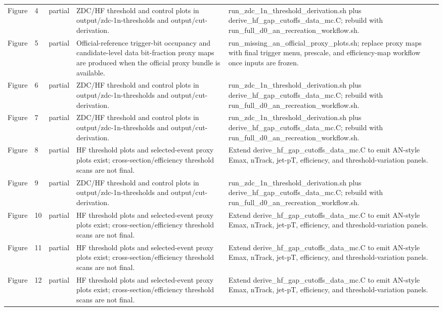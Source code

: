\documentclass[11pt]{article}
\begin{document}
\begin{longtable}{lll p{} p{}}
Figure & 4 & partial & ZDC/HF threshold and control plots in output/zdc-1n-thresholds and output/cut-derivation. & run\_zdc\_1n\_threshold\_derivation.sh plus derive\_hf\_gap\_cutoffs\_data\_mc.C; rebuild with run\_full\_d0\_an\_recreation\_workflow.sh. \\
Figure & 5 & partial & Official-reference trigger-bit occupancy and candidate-level data bit-fraction proxy maps are produced when the official proxy bundle is available. & run\_missing\_an\_official\_proxy\_plots.sh; replace proxy maps with final trigger menu, prescale, and efficiency-map workflow once inputs are frozen. \\
Figure & 6 & partial & ZDC/HF threshold and control plots in output/zdc-1n-thresholds and output/cut-derivation. & run\_zdc\_1n\_threshold\_derivation.sh plus derive\_hf\_gap\_cutoffs\_data\_mc.C; rebuild with run\_full\_d0\_an\_recreation\_workflow.sh. \\
Figure & 7 & partial & ZDC/HF threshold and control plots in output/zdc-1n-thresholds and output/cut-derivation. & run\_zdc\_1n\_threshold\_derivation.sh plus derive\_hf\_gap\_cutoffs\_data\_mc.C; rebuild with run\_full\_d0\_an\_recreation\_workflow.sh. \\
Figure & 8 & partial & HF threshold plots and selected-event proxy plots exist; cross-section/efficiency threshold scans are not final. & Extend derive\_hf\_gap\_cutoffs\_data\_mc.C to emit AN-style Emax, nTrack, jet-pT, efficiency, and threshold-variation panels. \\
Figure & 9 & partial & ZDC/HF threshold and control plots in output/zdc-1n-thresholds and output/cut-derivation. & run\_zdc\_1n\_threshold\_derivation.sh plus derive\_hf\_gap\_cutoffs\_data\_mc.C; rebuild with run\_full\_d0\_an\_recreation\_workflow.sh. \\
Figure & 10 & partial & HF threshold plots and selected-event proxy plots exist; cross-section/efficiency threshold scans are not final. & Extend derive\_hf\_gap\_cutoffs\_data\_mc.C to emit AN-style Emax, nTrack, jet-pT, efficiency, and threshold-variation panels. \\
Figure & 11 & partial & HF threshold plots and selected-event proxy plots exist; cross-section/efficiency threshold scans are not final. & Extend derive\_hf\_gap\_cutoffs\_data\_mc.C to emit AN-style Emax, nTrack, jet-pT, efficiency, and threshold-variation panels. \\
Figure & 12 & partial & HF threshold plots and selected-event proxy plots exist; cross-section/efficiency threshold scans are not final. & Extend derive\_hf\_gap\_cutoffs\_data\_mc.C to emit AN-style Emax, nTrack, jet-pT, efficiency, and threshold-variation panels. \\

\end{longtable}
\end{document}
